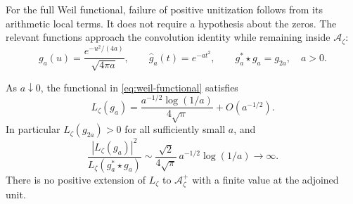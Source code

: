 \documentclass[11pt]{article}
\numberwithin{equation}{section}
\newcommand{\cA}{\mathcal A}
\begin{document}
For the full Weil functional, failure of positive unitization follows
from its arithmetic local terms.  It does not require a hypothesis about
the zeros.  The relevant functions approach the convolution identity
while remaining inside $\cA_\zeta$:
\begin{equation}
 g_a(u)=\frac{e^{-u^2/(4a)}}{\sqrt{4\pi a}},
 \qquad \widehat g_a(t)=e^{-at^2},
 \qquad g_a^*\star g_a=g_{2a},\quad a>0.
 \label{eq:gaussian-semigroup}
\end{equation}

\begin{theorem}
\label{thm:weil-mass}
As $a\downarrow0$, the functional in \eqref{eq:weil-functional} satisfies
\begin{equation}
 L_\zeta(g_a)
 =\frac{a^{-1/2}\log(1/a)}{4\sqrt\pi}+O(a^{-1/2}).
 \label{eq:weil-gaussian-asymptotic}
\end{equation}
In particular $L_\zeta(g_{2a})>0$ for all sufficiently small $a$, and
\begin{equation}
 \frac{|L_\zeta(g_a)|^2}{L_\zeta(g_a^*\star g_a)}
 \sim\frac{\sqrt2}{4\sqrt\pi}\,a^{-1/2}\log(1/a)
 \longrightarrow\infty.
 \label{eq:weil-unitization-divergence}
\end{equation}
There is no positive extension of $L_\zeta$ to $\cA_\zeta^+$ with a
finite value at the adjoined unit.
\end{theorem}
\end{document}
